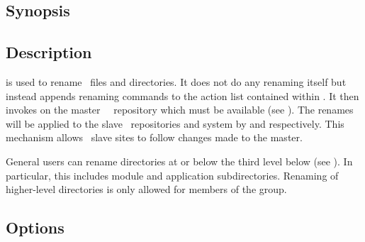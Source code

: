\subsection*{Synopsis}

\begin{synopsis}
\end{synopsis}

\subsection*{Description}

 is used to rename \aipspp\ files and directories.  It does not do
any renaming itself but instead appends renaming commands to the action list
contained within .  It then invokes
 on the master \aipspp\ \rcs\ repository which must
be available (see ).  The renames will be applied to the
slave \rcs\ repositories and system by  and 
respectively.  This mechanism allows \aipspp\ slave sites to follow changes
made to the master.

General users can rename directories at or below the third level below
 (see ).  In particular, this includes
module and application subdirectories.  Renaming of higher-level directories
is only allowed for members of the  group.  

\subsection*{Options}

